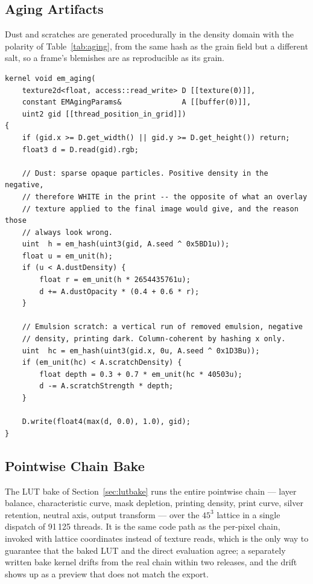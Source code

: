 \subsection{Aging Artifacts}

Dust and scratches are generated procedurally in the density domain with the
polarity of Table~\ref{tab:aging}, from the same hash as the grain field but a
different salt, so a frame's blemishes are as reproducible as its grain.

\begin{lstlisting}[language=Metal, caption={Dust and scratch overlay in negative density.}]
kernel void em_aging(
    texture2d<float, access::read_write> D [[texture(0)]],
    constant EMAgingParams&              A [[buffer(0)]],
    uint2 gid [[thread_position_in_grid]])
{
    if (gid.x >= D.get_width() || gid.y >= D.get_height()) return;
    float3 d = D.read(gid).rgb;

    // Dust: sparse opaque particles. Positive density in the negative,
    // therefore WHITE in the print -- the opposite of what an overlay
    // texture applied to the final image would give, and the reason those
    // always look wrong.
    uint  h = em_hash(uint3(gid, A.seed ^ 0x5BD1u));
    float u = em_unit(h);
    if (u < A.dustDensity) {
        float r = em_unit(h * 2654435761u);
        d += A.dustOpacity * (0.4 + 0.6 * r);
    }

    // Emulsion scratch: a vertical run of removed emulsion, negative
    // density, printing dark. Column-coherent by hashing x only.
    uint  hc = em_hash(uint3(gid.x, 0u, A.seed ^ 0x1D3Bu));
    if (em_unit(hc) < A.scratchDensity) {
        float depth = 0.3 + 0.7 * em_unit(hc * 40503u);
        d -= A.scratchStrength * depth;
    }

    D.write(float4(max(d, 0.0), 1.0), gid);
}
\end{lstlisting}

\subsection{Pointwise Chain Bake}

The LUT bake of Section~\ref{sec:lutbake} runs the entire pointwise chain ---
layer balance, characteristic curve, mask depletion, printing density, print
curve, silver retention, neutral axis, output transform --- over the $45^3$
lattice in a single dispatch of 91\,125 threads. It is the same code path as
the per-pixel chain, invoked with lattice coordinates instead of texture reads,
which is the only way to guarantee that the baked LUT and the direct evaluation
agree; a separately written bake kernel drifts from the real chain within two
releases, and the drift shows up as a preview that does not match the export.

